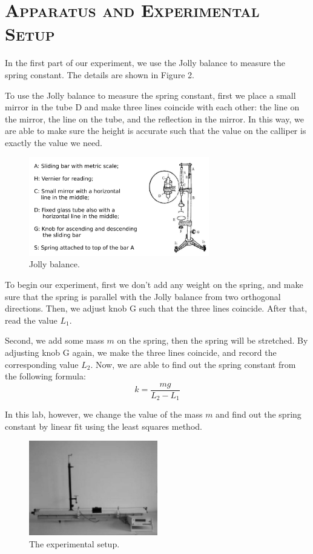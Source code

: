 \documentclass[a4paper,12pt]{article}
\begin{document}
\section{\textsc{Apparatus and Experimental Setup}}
In the first part of our experiment, we use the Jolly balance to measure the spring constant. The details are shown in Figure 2.
\par To use the Jolly balance to measure the spring constant, first we place a small mirror in the tube D and make three lines coincide with each other: the line on the mirror, the line on the tube, and the reflection in the mirror. In this way, we are able to make sure the height is accurate such that the value on the calliper is exactly the value we need. 
\begin{figure}[h] 
    \centering
    \includegraphics[width=0.7\textwidth]{Fig2} 
    \caption{Jolly balance. \cite{labmanual}} 
\end{figure}

To begin our experiment, first we don't add any weight on the spring, and make sure that the spring is parallel with the Jolly balance from two orthogonal directions. Then, we adjust knob G such that the three lines coincide. After that, read the value $L_1$.
\par Second, we add some mass $m$ on the spring, then the spring will be stretched. By adjusting knob G again, we make the three lines coincide, and record the corresponding value $L_2$. Now, we are able to find out the spring constant from the following formula:
\begin{equation}
k = \frac{mg}{L_2-L_1}
\end{equation}
\par In this lab, however, we change the value of the mass $m$ and find out the spring constant by linear fit using the least squares method\cite{labmanual}.

\begin{figure}[h] 
    \centering
    \includegraphics[width=0.5\textwidth]{Fig3} 
    \caption{The experimental setup. \cite{labmanual}} 
\end{figure}
\end{document}
